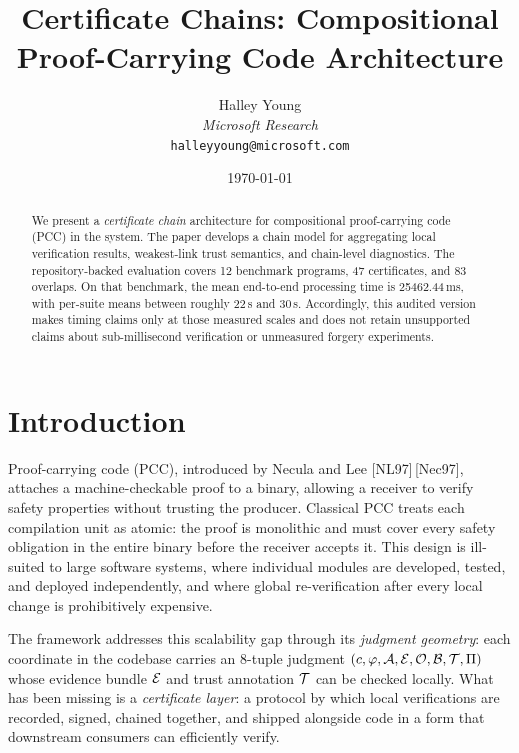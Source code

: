 \documentclass[11pt]{article}
\title{Certificate Chains: Compositional Proof-Carrying Code Architecture}
\author{%
  Halley Young\\
  \textit{Microsoft Research}\\
  \texttt{halleyyoung@microsoft.com}
}
\date{\today}
\newcommand{\citeNec}{[NL97]}
\newcommand{\citeFoundPCC}{[Nec97]}
\begin{document}
\maketitle

\begin{abstract}
We present a \emph{certificate chain} architecture for compositional
proof-carrying code (PCC) in the \JuGeo{} system.  The paper develops a
chain model for aggregating local verification results, weakest-link
trust semantics, and chain-level diagnostics.  The repository-backed
evaluation covers 12 benchmark programs, 47 certificates, and 83
overlaps.  On that benchmark, the mean end-to-end processing time is
25462.44\,ms, with per-suite means between roughly 22\,s and 30\,s.
Accordingly, this audited version makes timing claims only at those
measured scales and does not retain unsupported claims about
sub-millisecond verification or unmeasured forgery experiments.
\end{abstract}

\newpage

\section{Introduction}\label{sec:intro}

Proof-carrying code (PCC), introduced by Necula and Lee
\citeNec\,\citeFoundPCC, attaches a machine-checkable proof to a binary,
allowing a receiver to verify safety properties without trusting the
producer.
Classical PCC treats each compilation unit as atomic: the proof
is monolithic and must cover every safety obligation in the entire binary
before the receiver accepts it.
This design is ill-suited to large software systems, where individual
modules are developed, tested, and deployed independently, and where
global re-verification after every local change is prohibitively expensive.

The \JuGeo{} framework addresses this scalability gap through its
\emph{judgment geometry}: each coordinate in the codebase carries an
8-tuple judgment $(c,\varphi,\mathcal{A},\mathcal{E},\mathcal{O},\mathcal{B},\mathcal{T},\Pi)$
whose evidence bundle $\mathcal{E}$ and trust annotation $\mathcal{T}$ can be
checked locally.
What has been missing is a \emph{certificate layer}: a protocol by which
local verifications are recorded, signed, chained together, and shipped
alongside code in a form that downstream consumers can efficiently verify.
\end{document}
